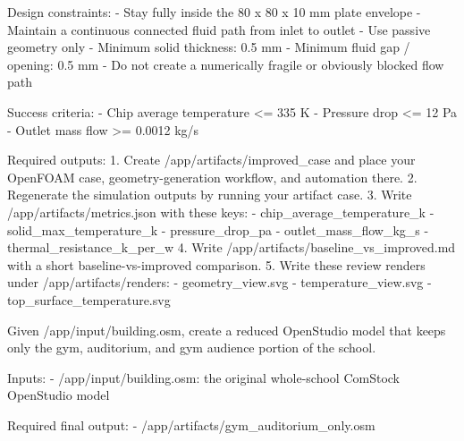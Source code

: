 \begin{instructionbox}
Design constraints:
- Stay fully inside the \textasciigrave{}80 x 80 x 10 mm\textasciigrave{} plate envelope
- Maintain a continuous connected fluid path from inlet to outlet
- Use passive geometry only
- Minimum solid thickness: \textasciigrave{}0.5 mm\textasciigrave{}
- Minimum fluid gap / opening: \textasciigrave{}0.5 mm\textasciigrave{}
- Do not create a numerically fragile or obviously blocked flow path

Success criteria:
- Chip average temperature \textasciigrave{}\textless{}= 335 K\textasciigrave{}
- Pressure drop \textasciigrave{}\textless{}= 12 Pa\textasciigrave{}
- Outlet mass flow \textasciigrave{}\textgreater{}= 0.0012 kg/s\textasciigrave{}

Required outputs:
1. Create \textasciigrave{}/app/artifacts/improved\_case\textasciigrave{} and place your OpenFOAM case, geometry-generation workflow, and automation there.
2. Regenerate the simulation outputs by running your artifact case.
3. Write \textasciigrave{}/app/artifacts/metrics.json\textasciigrave{} with these keys:
   - \textasciigrave{}chip\_average\_temperature\_k\textasciigrave{}
   - \textasciigrave{}solid\_max\_temperature\_k\textasciigrave{}
   - \textasciigrave{}pressure\_drop\_pa\textasciigrave{}
   - \textasciigrave{}outlet\_mass\_flow\_kg\_s\textasciigrave{}
   - \textasciigrave{}thermal\_resistance\_k\_per\_w\textasciigrave{}
4. Write \textasciigrave{}/app/artifacts/baseline\_vs\_improved.md\textasciigrave{} with a short baseline-vs-improved comparison.
5. Write these review renders under \textasciigrave{}/app/artifacts/renders\textasciigrave{}:
   - \textasciigrave{}geometry\_view.svg\textasciigrave{}
   - \textasciigrave{}temperature\_view.svg\textasciigrave{}
   - \textasciigrave{}top\_surface\_temperature.svg\textasciigrave{}
\end{instructionbox}

\begin{instructionbox}
Given \textasciigrave{}/app/input/building.osm\textasciigrave{}, create a reduced OpenStudio model that keeps only the gym, auditorium, and gym audience portion of the school.

Inputs:
- \textasciigrave{}/app/input/building.osm\textasciigrave{}: the original whole-school ComStock OpenStudio model

Required final output:
- \textasciigrave{}/app/artifacts/gym\_auditorium\_only.osm\textasciigrave{}
\end{instructionbox}

